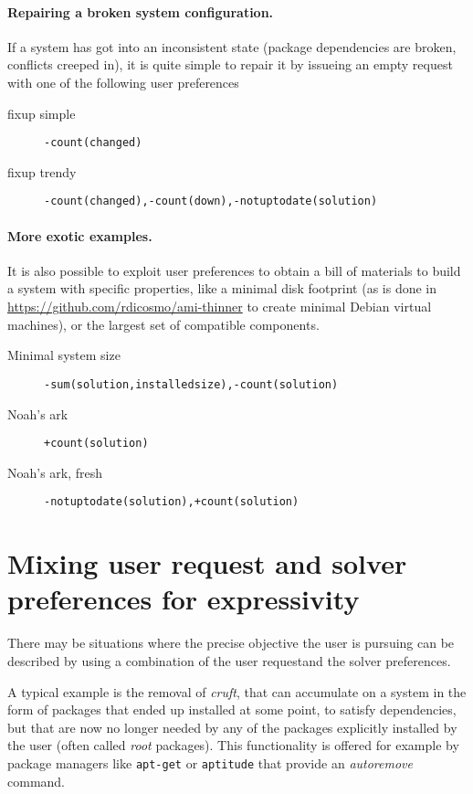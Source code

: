 \documentclass{article}
\newcommand{\solverpref}[1]{{\texttt{#1}}}
\begin{document}
\paragraph{Repairing a broken system configuration.} If a system has got into an inconsistent state (package dependencies are broken, conflicts creeped in), it
is quite simple to repair it by issueing an empty request with one of the following user preferences
\begin{description}
\item[fixup simple] \solverpref{-count(changed)}
\item[fixup trendy] \solverpref{-count(changed),-count(down),-notuptodate(solution)}
\end{description}

\paragraph{More exotic examples.} It is also possible to exploit user preferences to obtain a bill of materials to build a system with
specific properties, like a minimal disk footprint (as is done in \url{https://github.com/rdicosmo/ami-thinner} to create minimal Debian
virtual machines), or the largest set of compatible components.

\begin{description}
\item[Minimal system size] \solverpref{-sum(solution,installedsize),-count(solution)}
\item[Noah's ark] \solverpref{+count(solution)}
\item[Noah's ark, fresh] \solverpref{-notuptodate(solution),+count(solution)}
\end{description}

\section{Mixing user request and solver preferences for expressivity}\label{sect:mix}

There may be situations where the precise objective the user is pursuing can be
described by using a combination of the user requestand the solver preferences.

A typical example is the removal of \emph{cruft}, that can accumulate on a
system in the form of packages that ended up installed at some point, to satisfy
dependencies, but that are now no longer needed by any of the packages
explicitly installed by the user (often called \emph{root} packages).  This
functionality is offered for example by package managers like \texttt{apt-get}
or \texttt{aptitude} that provide an \emph{autoremove} command.\\
\end{document}
